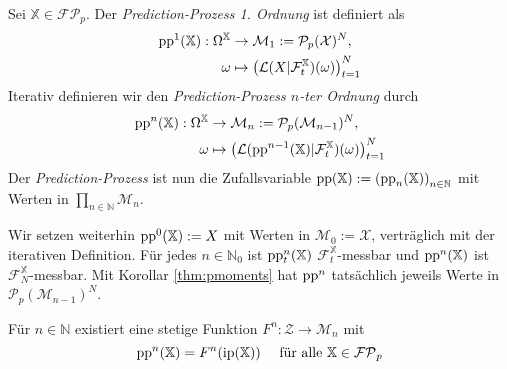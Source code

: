     \begin{definition}
        Sei $\mathbb{X} \in \mathcal{FP}_p$. Der \emph{Prediction-Prozess 1. Ordnung} ist definiert als
        \begin{align*}
            \operatorname{pp}^1(\mathbb{X}): \Omega^\mathbb{X} &\rightarrow \mathcal{M}_1 := \mathcal{P}_p(\mathcal{X})^N, \\
            \omega &\mapsto \left(\mathcal{L}(X \vert \mathcal{F}_t^\mathbb{X})(\omega)\right)_{t=1}^{N}
        \end{align*}
        Iterativ definieren wir den \emph{Prediction-Prozess $n$-ter Ordnung} durch
        \begin{align*}
            \operatorname{pp}^n(\mathbb{X}): \Omega^\mathbb{X} &\rightarrow \mathcal{M}_n := \mathcal{P}_p(\mathcal{M}_{n-1})^N, \\
            \omega &\mapsto \left(\mathcal{L}(\operatorname{pp}^{n-1}(\mathbb{X}) \vert \mathcal{F}_t^\mathbb{X})(\omega)\right)_{t=1}^{N}
        \end{align*}
        Der \emph{Prediction-Prozess} ist nun die Zufallsvariable $\operatorname{pp}(\mathbb{X}) := \left(\operatorname{pp}_n(\mathbb{X})\right)_{n\in\mathbb{N}}$ mit Werten in $\prod_{n\in\mathbb{N}} \mathcal{M}_n$.
    \end{definition}
    Wir setzen weiterhin $\operatorname{pp}^0(\mathbb{X}):=X$ mit Werten in $\mathcal{M}_0:=\mathcal{X}$, verträglich mit der iterativen Definition. Für jedes $n \in \mathbb{N}_0$ ist $\operatorname{pp}^n_t(\mathbb{X})$ $\mathcal{F}_t^\mathbb{X}$-messbar und $\operatorname{pp}^n(\mathbb{X})$ ist $\mathcal{F}_N^\mathbb{X}$-messbar. Mit Korollar \ref{thm:pmoments} hat $\operatorname{pp}^n$ tatsächlich jeweils Werte in $\mathcal{P}_p(\mathcal{M}_{n-1})^N$.
    \begin{lemma}\label{thm:pp_from_ip}
        Für $n \in \mathbb{N}$ existiert eine stetige Funktion $F^n: \mathcal{Z} \rightarrow \mathcal{M}_n$ mit 
        $$\operatorname{pp}^n(\mathbb{X}) = F^{n}(\operatorname{ip}(\mathbb{X})) \quad \text{ für alle } \mathbb{X} \in \mathcal{FP}_p$$
    \end{lemma}
